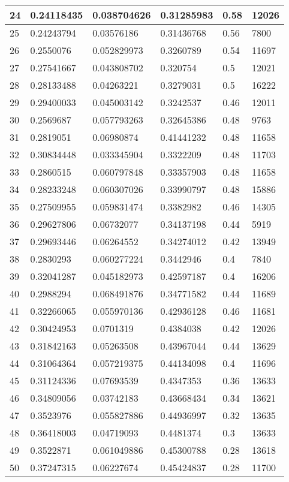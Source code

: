 \begin{longtable}{|l|l|l|l|l|l|}
24 & 0.24118435 & 0.038704626 & 0.31285983 & 0.58 & 12026 \\ \hline 
25 & 0.24243794 & 0.03576186 & 0.31436768 & 0.56 & 7800 \\ \hline 
26 & 0.2550076 & 0.052829973 & 0.3260789 & 0.54 & 11697 \\ \hline 
27 & 0.27541667 & 0.043808702 & 0.320754 & 0.5 & 12021 \\ \hline 
28 & 0.28133488 & 0.04263221 & 0.3279031 & 0.5 & 16222 \\ \hline 
29 & 0.29400033 & 0.045003142 & 0.3242537 & 0.46 & 12011 \\ \hline 
30 & 0.2569687 & 0.057793263 & 0.32645386 & 0.48 & 9763 \\ \hline 
31 & 0.2819051 & 0.06980874 & 0.41441232 & 0.48 & 11658 \\ \hline 
32 & 0.30834448 & 0.033345904 & 0.3322209 & 0.48 & 11703 \\ \hline 
33 & 0.2860515 & 0.060797848 & 0.33357903 & 0.48 & 11658 \\ \hline 
34 & 0.28233248 & 0.060307026 & 0.33990797 & 0.48 & 15886 \\ \hline 
35 & 0.27509955 & 0.059831474 & 0.3382982 & 0.46 & 14305 \\ \hline 
36 & 0.29627806 & 0.06732077 & 0.34137198 & 0.44 & 5919 \\ \hline 
37 & 0.29693446 & 0.06264552 & 0.34274012 & 0.42 & 13949 \\ \hline 
38 & 0.2830293 & 0.060277224 & 0.3442946 & 0.4 & 7840 \\ \hline 
39 & 0.32041287 & 0.045182973 & 0.42597187 & 0.4 & 16206 \\ \hline 
40 & 0.2988294 & 0.068491876 & 0.34771582 & 0.44 & 11689 \\ \hline 
41 & 0.32266065 & 0.055970136 & 0.42936128 & 0.46 & 11681 \\ \hline 
42 & 0.30424953 & 0.0701319 & 0.4384038 & 0.42 & 12026 \\ \hline 
43 & 0.31842163 & 0.05263508 & 0.43967044 & 0.44 & 13629 \\ \hline 
44 & 0.31064364 & 0.057219375 & 0.44134098 & 0.4 & 11696 \\ \hline 
45 & 0.31124336 & 0.07693539 & 0.4347353 & 0.36 & 13633 \\ \hline 
46 & 0.34809056 & 0.03742183 & 0.43668434 & 0.34 & 13621 \\ \hline 
47 & 0.3523976 & 0.055827886 & 0.44936997 & 0.32 & 13635 \\ \hline 
48 & 0.36418003 & 0.04719093 & 0.4481374 & 0.3 & 13633 \\ \hline 
49 & 0.3522871 & 0.061049886 & 0.45300788 & 0.28 & 13618 \\ \hline 
50 & 0.37247315 & 0.06227674 & 0.45424837 & 0.28 & 11700 \\ \hline 
\end{longtable}